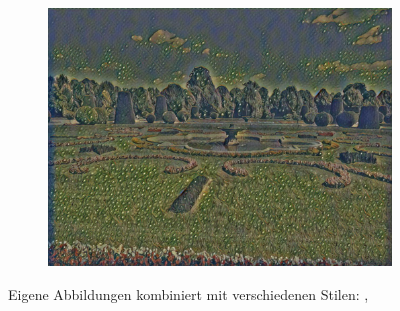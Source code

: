\begin{figure}[H]
\begin{subfigure}[h]{0.32\textwidth}
        \includegraphics[width=\textwidth]{resources/content/experiments/garden-vgg16_portrait_of_joseph_roulin.jpg}
    \end{subfigure}

    \caption{Eigene Abbildungen kombiniert mit verschiedenen Stilen: \cite{crystal_glass_on_a_colorful_background_img}, \cite{portrait_of_joseph_roulin_img}}
    \label{img:trained_models1}
\end{figure}

